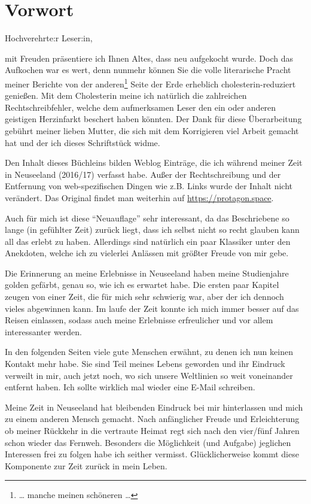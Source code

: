 \chapter{Vorwort}

Hochverehrte:r Leser:in,

mit Freuden präsentiere ich Ihnen Altes, dass neu aufgekocht wurde.
Doch das Aufkochen war es wert, denn nunmehr können Sie die volle
literarische Pracht meiner Berichte von der anderen\footnote{\ldots{}
  manche meinen schöneren \ldots{}} Seite der Erde erheblich
cholesterin-reduziert genießen. Mit dem Cholesterin meine ich
natürlich die zahlreichen Rechtschreibfehler, welche dem aufmerksamen
Leser den ein oder anderen geistigen Herzinfarkt beschert haben
könnten. Der Dank für diese Überarbeitung gebührt meiner lieben
Mutter, die sich mit dem Korrigieren viel Arbeit gemacht hat und der
ich dieses Schriftstück widme.

Den Inhalt dieses Büchleins bilden Weblog Einträge, die ich während
meiner Zeit in Neuseeland (2016/17) verfasst habe. Außer der
Rechtschreibung und der Entfernung von web-spezifischen Dingen wie
z.B. Links wurde der Inhalt nicht verändert. Das Original findet man
weiterhin auf \url{https://protagon.space}.

Auch für mich ist diese ``Neuauflage'' sehr interessant, da das
Beschriebene so lange (in gefühlter Zeit) zurück liegt, dass ich
selbst nicht so recht glauben kann all das erlebt zu haben. Allerdings
sind natürlich ein paar Klassiker unter den Anekdoten, welche ich zu
vielerlei Anlässen mit größter Freude von mir gebe.

Die Erinnerung an meine Erlebnisse in Neuseeland haben meine
Studienjahre golden gefärbt, genau so, wie ich es erwartet habe. Die
ersten paar Kapitel zeugen von einer Zeit, die für mich sehr schwierig
war, aber der ich dennoch vieles abgewinnen kann. Im laufe der Zeit
konnte ich mich immer besser auf das Reisen einlassen, sodass auch
meine Erlebnisse erfreulicher und vor allem interessanter werden.

In den folgenden Seiten viele gute Menschen erwähnt, zu denen ich nun
keinen Kontakt mehr habe. Sie sind Teil meines Lebens geworden und ihr
Eindruck verweilt in mir, auch jetzt noch, wo sich unsere Weltlinien
so weit voneinander entfernt haben. Ich sollte wirklich mal wieder
eine E-Mail schreiben.

Meine Zeit in Neuseeland hat bleibenden Eindruck bei mir hinterlassen
und mich zu einem anderen Mensch gemacht. Nach anf\"anglicher Freude
und Erleichterung ob meiner R\"uckkehr in die vertraute Heimat regt
sich nach den vier/f\"unf Jahren schon wieder das Fernweh. Besonders
die M\"oglichkeit (und Aufgabe) jeglichen Interessen frei zu folgen
habe ich seither vermisst. Gl\"ucklicherweise kommt diese Komponente
zur Zeit zur\"uck in mein Leben.

